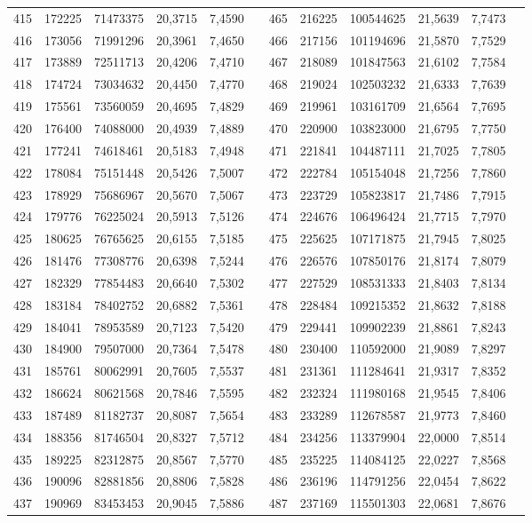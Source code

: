 \begin{longtable}{p{.17\linewidth}*{11}{S}}
415&172225&71473375&20,3715&7,4590&&465&216225&100544625&21,5639&7,7473\\
416&173056&71991296&20,3961&7,4650&&466&217156&101194696&21,5870&7,7529\\
417&173889&72511713&20,4206&7,4710&&467&218089&101847563&21,6102&7,7584\\
418&174724&73034632&20,4450&7,4770&&468&219024&102503232&21,6333&7,7639\\
419&175561&73560059&20,4695&7,4829&&469&219961&103161709&21,6564&7,7695\\
420&176400&74088000&20,4939&7,4889&&470&220900&103823000&21,6795&7,7750\\
421&177241&74618461&20,5183&7,4948&&471&221841&104487111&21,7025&7,7805\\
422&178084&75151448&20,5426&7,5007&&472&222784&105154048&21,7256&7,7860\\
423&178929&75686967&20,5670&7,5067&&473&223729&105823817&21,7486&7,7915\\
424&179776&76225024&20,5913&7,5126&&474&224676&106496424&21,7715&7,7970\\
425&180625&76765625&20,6155&7,5185&&475&225625&107171875&21,7945&7,8025\\
426&181476&77308776&20,6398&7,5244&&476&226576&107850176&21,8174&7,8079\\
427&182329&77854483&20,6640&7,5302&&477&227529&108531333&21,8403&7,8134\\
428&183184&78402752&20,6882&7,5361&&478&228484&109215352&21,8632&7,8188\\
429&184041&78953589&20,7123&7,5420&&479&229441&109902239&21,8861&7,8243\\
430&184900&79507000&20,7364&7,5478&&480&230400&110592000&21,9089&7,8297\\
431&185761&80062991&20,7605&7,5537&&481&231361&111284641&21,9317&7,8352\\
432&186624&80621568&20,7846&7,5595&&482&232324&111980168&21,9545&7,8406\\
433&187489&81182737&20,8087&7,5654&&483&233289&112678587&21,9773&7,8460\\
434&188356&81746504&20,8327&7,5712&&484&234256&113379904&22,0000&7,8514\\
435&189225&82312875&20,8567&7,5770&&485&235225&114084125&22,0227&7,8568\\
436&190096&82881856&20,8806&7,5828&&486&236196&114791256&22,0454&7,8622\\
437&190969&83453453&20,9045&7,5886&&487&237169&115501303&22,0681&7,8676\\

\end{longtable}
